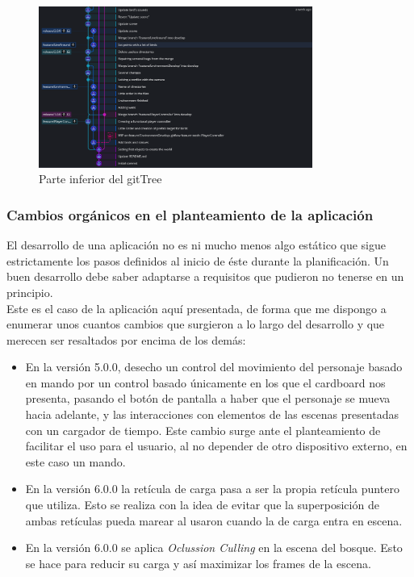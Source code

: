 \begin{figure}[htb]
	\centering
	\includegraphics[width=0.8\textwidth]{./imagenes/git-tree2}
	\caption{Parte inferior del gitTree}
\end{figure}
\FloatBarrier

\subsubsection{Cambios orgánicos en el planteamiento de la aplicación}

\quad El desarrollo de una aplicación no es ni mucho menos algo estático que sigue estrictamente los pasos definidos al inicio de éste durante la planificación. Un buen desarrollo debe saber adaptarse a requisitos que pudieron no tenerse en un principio.\\

\quad Este es el caso de la aplicación aquí presentada, de forma que me dispongo a enumerar unos cuantos cambios que surgieron a lo largo del desarrollo y que merecen ser resaltados por encima de los demás:

\begin{itemize}
	\item En la versión 5.0.0, desecho un control del movimiento del personaje basado en mando por un control basado únicamente en los que el cardboard nos presenta, pasando el botón de pantalla a haber que el personaje se mueva hacia adelante, y las interacciones con elementos de las escenas presentadas con un cargador de tiempo. Este cambio surge ante el planteamiento de  facilitar el uso para el usuario, al no depender de otro dispositivo externo, en este caso un mando.
	\item En la versión 6.0.0 la retícula de carga pasa a ser la propia retícula puntero que utiliza. Esto se realiza con la idea de evitar que la superposición de ambas retículas pueda marear al usaron cuando la de carga entra en escena.
	\item En la versión 6.0.0 se aplica \textit{Oclussion Culling} en la escena del bosque. Esto se hace para reducir su carga y así maximizar los frames de la escena.
\end{itemize}

